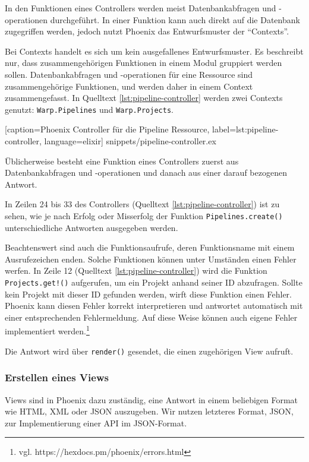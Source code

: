 In den Funktionen eines Controllers werden meist Datenbankabfragen und -operationen durchgeführt. In einer Funktion kann auch direkt auf die Datenbank zugegriffen werden, jedoch nutzt Phoenix das Entwurfsmuster der ``Contexts''.

Bei Contexts handelt es sich um kein ausgefallenes Entwurfsmuster. Es beschreibt nur, dass zusammengehörigen Funktionen in einem Modul gruppiert werden sollen. Datenbankabfragen und -operationen für eine Ressource sind zusammengehörige Funktionen, und werden daher in einem Context zusammengefasst. In Quelltext \ref{lst:pipeline-controller} werden zwei Contexts genutzt: \texttt{Warp.Pipelines} und \texttt{Warp.Projects}.


  [caption={Phoenix Controller für die Pipeline Ressource},
  label={lst:pipeline-controller},
  language=elixir]
  {snippets/pipeline-controller.ex}

Üblicherweise besteht eine Funktion eines Controllers zuerst aus Datenbankabfragen und -operationen und danach aus einer darauf bezogenen Antwort.

In Zeilen 24 bis 33 des Controllers (Quelltext \ref{lst:pipeline-controller}) ist zu sehen, wie je nach Erfolg oder Misserfolg der Funktion \texttt{Pipelines.create()} unterschiedliche Antworten ausgegeben werden.

Beachtenswert sind auch die Funktionsaufrufe, deren Funktionsname mit einem Ausrufezeichen enden. Solche Funktionen können unter Umständen einen Fehler werfen. In Zeile 12 (Quelltext \ref{lst:pipeline-controller}) wird die Funktion \texttt{Projects\allowbreak.get!()} aufgerufen, um ein Projekt anhand seiner ID abzufragen. Sollte kein Projekt mit dieser ID gefunden werden, wirft diese Funktion einen Fehler. Phoenix kann diesen Fehler korrekt interpretieren und antwortet automatisch mit einer entsprechenden Fehlermeldung. Auf diese Weise können auch eigene Fehler implementiert werden.\footnote{vgl. https://hexdocs.pm/phoenix/errors.html}

Die Antwort wird über \texttt{render()} gesendet, die einen zugehörigen View aufruft.

\subsubsection{Erstellen eines Views}

Views sind in Phoenix dazu zuständig, eine Antwort in einem beliebigen Format wie HTML, XML oder JSON auszugeben. Wir nutzen letzteres Format, JSON, zur Implementierung einer API im JSON-Format.

